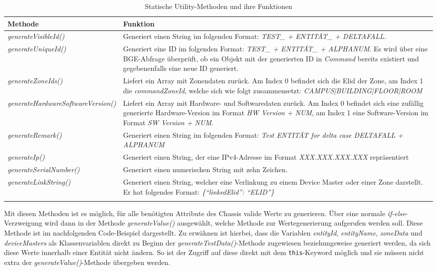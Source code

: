 \begin{longtable}[H]{| p{} | p{} |}
    \hline
    Methode & Funktion \\ 
    \hline\hline
    \textit{generateVisibleId()} & Generiert einen String im folgenden Format: \textit{TEST\_ + ENTITÄT\_ + DELTAFALL}. \\ 
    \hline
    \textit{generateUniqueId()} & Generiert eine ID im folgenden Format: \textit{TEST\_ + ENTITÄT\_ + ALPHANUM}. Es wird über eine \ac{BGE}-Abfrage überprüft, ob ein Objekt mit der generierten ID in \textit{Command} bereits existiert und gegebenenfalls eine neue ID generiert. \\  
    \hline
    \textit{generateZoneIds()} & Liefert ein Array mit Zonendaten zurück. Am Index 0 befindet sich die \ac{Elid} der Zone, am Index 1 die \textit{commandZoneId}, welche sich wie folgt zusammensetzt: \textit{CAMPUS|BUILDING|FLOOR|ROOM} \\ 
    \hline
    \textit{generateHardwareSoftwareVersion()} & Liefert ein Array mit Hardware- und Softwaredaten zurück. Am Index 0 befindet sich eine zufällig generierte Hardware-Version im Format \textit{HW Version + NUM}, am Index 1 eine Software-Version im Format \textit{SW Version + NUM}. \\ 
    \hline
    \textit{generateRemark()} & Generiert einen String im folgenden Format: \textit{Test ENTITÄT for delta case DELTAFALL + ALPHANUM} \\ 
    \hline
    \textit{generateIp()} & Generiert einen String, der eine IPv4-Adresse im Format \textit{XXX.XXX.XXX.XXX} repräsentiert \\ 
    \hline
    \textit{generateSerialNumber()} & Generiert einen numerischen String mit zehn Zeichen. \\ 
    \hline
    \textit{generateLinkString()} & Generiert einen String, welcher eine Verlinkung zu einem Device Master oder einer Zone darstellt. Er hat folgendes Format: \textit{\{``linkedElid'': ``ELID''\}} \\ 
    \hline
\caption{Statische Utility-Methoden und ihre Funktionen}\label{tab:utilityMethods}
\end{longtable}

Mit diesen Methoden ist es möglich, für alle benötigten Attribute des Chassis valide Werte zu generieren. Über eine normale \textit{if-else}-Verzweigung wird dann in der Methode \textit{generateValue()} ausgewählt, welche Methode zur Wertegenerierung aufgerufen werden soll. Diese Methode ist im nachfolgenden Code-Beispiel dargestellt. Zu erwähnen ist hierbei, dass die Variablen \textit{entityId}, \textit{entityName}, \textit{zoneData} und \textit{deviceMasters} als Klassenvariablen direkt zu Beginn der \textit{generateTestData()}-Methode zugewiesen beziehungsweise generiert werden, da sich diese Werte innerhalb einer Entität nicht ändern. So ist der Zugriff auf diese direkt mit dem \colorbox{background}{\lstinline{this}}-Keyword möglich und sie müssen nicht extra der \textit{generateValue()}-Methode übergeben werden.

